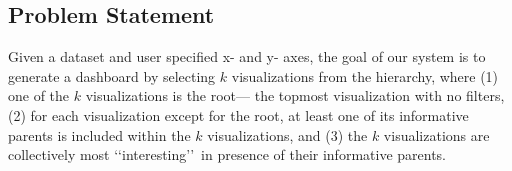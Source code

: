 
\subsection{Problem Statement}

Given a dataset and user specified x- and y- axes, the goal of our system is to generate a dashboard by selecting $k$ visualizations from the hierarchy, where (1) one of the $k$ visualizations is the root--- the topmost visualization with no filters, (2) for each visualization except for the root, at least one of its informative parents is included within the $k$ visualizations, and (3) the $k$ visualizations are collectively most \lq\lq interesting\rq\rq\ in presence of their informative parents.

